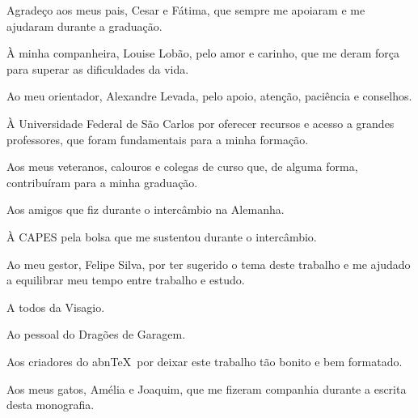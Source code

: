 \begin{agradecimentos}
    Agradeço aos meus pais, Cesar e Fátima, que sempre me apoiaram e me ajudaram durante a graduação.
    
    À minha companheira, Louise Lobão, pelo amor e carinho, que me deram força para superar as dificuldades da vida.
    
    Ao meu orientador, Alexandre Levada, pelo apoio, atenção, paciência e conselhos.
    
    À Universidade Federal de São Carlos por oferecer recursos e acesso a grandes professores, que foram fundamentais para a minha formação.
    
    Aos meus veteranos, calouros e colegas de curso que, de alguma forma, contribuíram para a minha graduação.
    
    Aos amigos que fiz durante o intercâmbio na Alemanha.
    
    À CAPES pela bolsa que me sustentou durante o intercâmbio.
    
    Ao meu gestor, Felipe Silva, por ter sugerido o tema deste trabalho e me ajudado a equilibrar meu tempo entre trabalho e estudo.
    
    A todos da Visagio.
    
    Ao pessoal do Dragões de Garagem.

    Aos criadores do abn\TeX\ por deixar este trabalho tão bonito e bem formatado.

    Aos meus gatos, Amélia e Joaquim, que me fizeram companhia durante a escrita desta monografia.

\end{agradecimentos}

